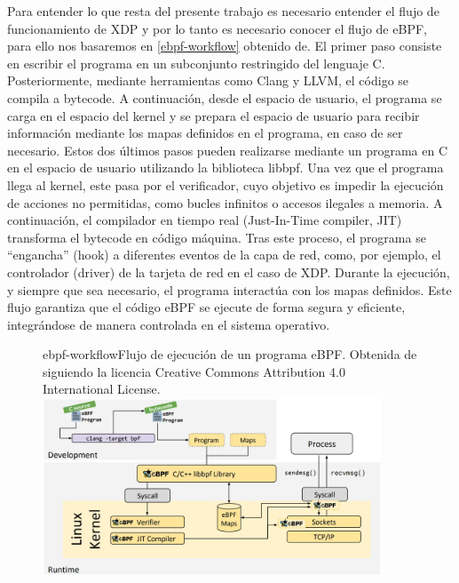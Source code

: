 Para entender lo que resta del presente trabajo es necesario entender el flujo de funcionamiento de XDP y por lo tanto es necesario conocer el flujo de eBPF, para ello nos basaremos en \ref{ebpf-workflow} obtenido de\cite{ebpf_website}. El primer paso consiste en escribir el programa en un subconjunto restringido del lenguaje C. Posteriormente, mediante herramientas como Clang y LLVM, el código se compila a bytecode. A continuación, desde el espacio de usuario, el programa se carga en el espacio del kernel y se prepara el espacio de usuario para recibir información mediante los mapas definidos en el programa, en caso de ser necesario. Estos dos últimos pasos pueden realizarse mediante un programa en C en el espacio de usuario utilizando la biblioteca libbpf. Una vez que el programa llega al kernel, este pasa por el verificador, cuyo objetivo es impedir la ejecución de acciones no permitidas, como bucles infinitos o accesos ilegales a memoria. A continuación, el compilador en tiempo real (Just-In-Time compiler, JIT) transforma el bytecode en código máquina. Tras este proceso, el programa se “engancha” (hook) a diferentes eventos de la capa de red, como, por ejemplo, el controlador (driver) de la tarjeta de red en el caso de XDP. Durante la ejecución, y siempre que sea necesario, el programa interactúa con los mapas definidos. Este flujo garantiza que el código eBPF se ejecute de forma segura y eficiente, integrándose de manera controlada en el sistema operativo.

\begin{figure}[Flujo eBPF]{ebpf-workflow}{Flujo de ejecución de un programa eBPF. Obtenida de\cite{ebpf_website} siguiendo la licencia Creative Commons Attribution 4.0 International License.}
	\includegraphics[width=0.9\textwidth]{capturas/eBPF_workflow.png}
\end{figure}


